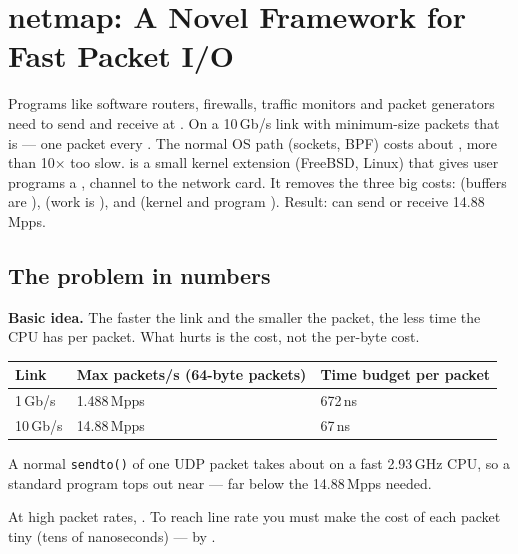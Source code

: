 \chapter{netmap: A Novel Framework for Fast Packet I/O}

\begin{keybox}
Programs like software routers, firewalls, traffic monitors and packet generators need to send and receive  at . On a 10\,Gb/s link with minimum-size packets that is  --- one packet every . The normal OS path (sockets, BPF) costs about , more than 10$\times$ too slow.  is a small kernel extension (FreeBSD, Linux) that gives user programs a , channel to the network card. It removes the three big costs:  (buffers are ),  (work is ), and  (kernel and program ). Result:  can send or receive 14.88\,Mpps.
\end{keybox}

\section{The problem in numbers}
\textbf{Basic idea.} The faster the link and the smaller the packet, the less time the CPU has per packet. What hurts is the  cost, not the per-byte cost.
\begin{center}
\begin{tabular}{@{}lll@{}}
\toprule
\textbf{Link} & \textbf{Max packets/s (64-byte packets)} & \textbf{Time budget per packet} \\
\midrule
1\,Gb/s & 1.488\,Mpps & 672\,ns \\
10\,Gb/s & 14.88\,Mpps & 67\,ns \\
\bottomrule
\end{tabular}
\end{center}
A normal \texttt{sendto()} of one UDP packet takes about  on a fast 2.93\,GHz CPU, so a standard program tops out near  --- far below the 14.88\,Mpps needed.

\begin{keybox}
At high packet rates, . To reach line rate you must make the cost of each packet tiny (tens of nanoseconds) --- by .
\end{keybox}

